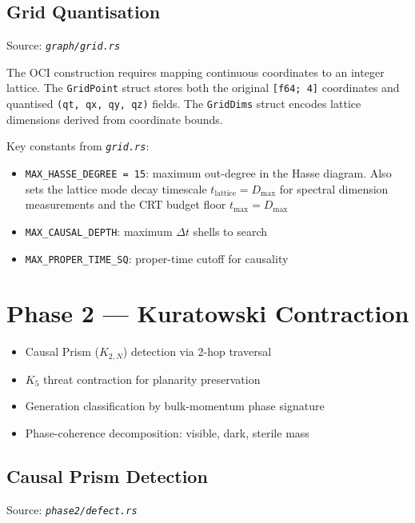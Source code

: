 \documentclass[11pt, a4paper, openany]{book}
\newcommand{\code}[1]{\texttt{#1}}
\newcommand{\file}[1]{\texttt{\itshape #1}}
\newenvironment{introduction}[1][Chapter Overview]{%
  \begin{tcolorbox}[
    enhanced,colback=structure!5,colframe=structure,
    colbacktitle=structure,coltitle=white,
    fonttitle=\small\bfseries,title={#1},
    arc=2pt,boxrule=0.7pt,
    left=8pt,right=8pt,top=6pt,bottom=6pt,
    before skip=12pt,after skip=12pt
  ]\itshape\begin{itemize}[leftmargin=*,itemsep=2pt,parsep=0pt]
}{%
  \end{itemize}\end{tcolorbox}
}
\begin{document}
\section{Grid Quantisation}

Source: \file{graph/grid.rs}

The OCI construction requires mapping continuous coordinates to an integer lattice.
The \code{GridPoint} struct stores both the original \code{[f64; 4]} coordinates
and quantised \code{(qt, qx, qy, qz)} fields.  The \code{GridDims} struct
encodes lattice dimensions derived from coordinate bounds.

Key constants from \file{grid.rs}:
\begin{itemize}
  \item \code{MAX\_HASSE\_DEGREE = 15}: maximum out-degree in the Hasse diagram.
        Also sets the lattice mode decay timescale $t_{\text{lattice}} = D_{\max}$
        for spectral dimension measurements and the CRT budget floor
        $t_{\max} = D_{\max}$
  \item \code{MAX\_CAUSAL\_DEPTH}: maximum $\Delta t$ shells to search
  \item \code{MAX\_PROPER\_TIME\_SQ}: proper-time cutoff for causality
\end{itemize}


\chapter{Phase 2 --- Kuratowski Contraction}

\begin{introduction}
  \item Causal Prism ($K_{2,N}$) detection via 2-hop traversal
  \item $K_5$ threat contraction for planarity preservation
  \item Generation classification by bulk-momentum phase signature
  \item Phase-coherence decomposition: visible, dark, sterile mass
\end{introduction}

\section{Causal Prism Detection}

Source: \file{phase2/defect.rs}
\end{document}

